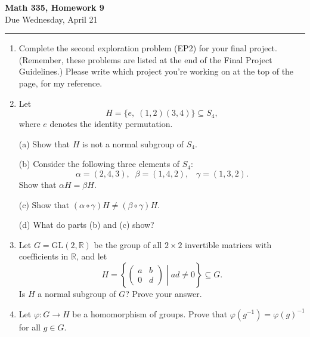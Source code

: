 \documentclass[11pt,twoside]{article}
\begin{document}
\begin{center}
{\bf \Large Math 335, Homework 9}\\
\vspace{0.1in}
{\Large Due Wednesday, April 21}
\vspace{0.1cm}
\end{center}

\hrule

\vspace{.2in}

\begin{enumerate}

 
 \item Complete the second exploration problem (EP2) for your final project.  (Remember, these problems are listed at the end of the Final Project Guidelines.)  Please write which project you're working on at the top of the page, for my reference.
 
\vspace{0.5cm}

\item Let
\[H = \{ e, \; (1,2)(3,4)\} \subseteq S_4,\]
where $e$ denotes the identity permutation.

\vspace{0.25cm}

\noindent (a) Show that $H$ is not a normal subgroup of $S_4$.

\vspace{0.5cm}

\noindent (b) Consider the following three elements of $S_4$:
\[\alpha = (2,4,3), \;\; \beta = (1,4,2), \;\;\; \gamma = (1,3,2).\]
Show that $\alpha H = \beta H$.

\vspace{0.5cm}

\noindent (c) Show that $(\alpha \circ \gamma) H \neq (\beta \circ \gamma) H$.

\vspace{0.5cm}

\noindent (d) What do parts (b) and (c) show?

\vspace{0.5cm}

\item Let $G= \text{GL}(2,\mathbb{R})$ be the group of all $2 \times 2$ invertible matrices with coefficients in $\mathbb{R}$, and let
\[H = \left\{ \left. \left(\begin{array}{cc} a & b \\ 0 & d \end{array}\right) \; \right| \; ad \neq 0 \right\} \subseteq G.\]
Is $H$ a normal subgroup of $G$?  Prove your answer.

\vspace{0.5cm}

\item Let $\varphi: G\rightarrow H$ be a homomorphism of groups.  Prove that $\varphi(g^{-1}) = \varphi(g)^{-1}$ for all $g \in G$.

\end{enumerate}
\end{document}
